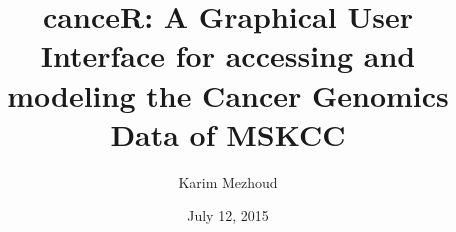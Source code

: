 \documentclass[a4paper]{article}
\begin{document}



\title{canceR: A Graphical User Interface for accessing and modeling the Cancer Genomics Data of MSKCC}
\author{Karim Mezhoud}
\date{July 12, 2015}
\maketitle

\end{document}
